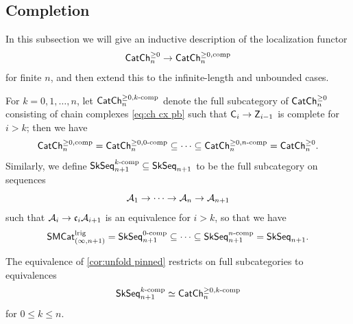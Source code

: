 \documentclass[a4paper,11pt]{article}
\begin{document}
\subsection{Completion}
\label{sec:completion}

In this subsection we will give an inductive description of the
localization functor
\[ \CChp_{n} \to \CChpc_{n}\]
for finite $n$, and then extend this to the infinite-length and unbounded
cases.

\begin{notation}
  For $k = 0,1,\dots,n$, let $\textup{\textsf{CatCh}}^{\geq 0,k\text{\textup{-comp}}}_{n}$ denote the full subcategory of $\textup{\textsf{CatCh}}^{\geq 0}_{n}$
  consisting of chain complexes \cref{eq:ch cx pb}
  such that $\oC_{i} \to \oZ_{i-1}$ is complete for $i > k$; then
  we have
  \[ \textup{\textsf{CatCh}}^{\geq 0,\text{\textup{comp}}}_{n} = \textup{\textsf{CatCh}}^{\geq 0,0\text{\textup{-comp}}}_{n} \subseteq 
    \cdots \subseteq \textup{\textsf{CatCh}}^{\geq 0,n\text{\textup{-comp}}}_{n} = \textup{\textsf{CatCh}}^{\geq 0}_{n}.\]
  Similarly, we define $\textup{\textsf{SkSeq}}_{n+1}^{k\text{\textup{-comp}}} \subseteq
  \textup{\textsf{SkSeq}}_{n+1}$ to be the full
  subcategory on sequences
  \[ \nA_{1} \to \cdots \to \nA_{n} \to \nA_{n+1}\]
  such that $\nA_{i} \to \core[i] \nA_{i+1}$ is an equivalence for $i
  > k$, so that we have
  \[ \textup{\textsf{SMCat}}_{(\infty,n+1)}^{\text{\textup{lrig}}} = \textup{\textsf{SkSeq}}_{n+1}^{0\text{\textup{-comp}}} \subseteq \cdots
    \subseteq \textup{\textsf{SkSeq}}_{n+1}^{n\text{\textup{-comp}}} = \textup{\textsf{SkSeq}}_{n+1}.\]
\end{notation}

\begin{observation}
  The equivalence of \cref{cor:unfold pinned} restricts on full
  subcategories to equivalences
  \[ \textup{\textsf{SkSeq}}_{n+1}^{k\text{\textup{-comp}}} \simeq
    \textup{\textsf{CatCh}}^{\geq 0,k\text{\textup{-comp}}}_{n} \]
  for $0 \leq k \leq n$.
\end{observation}
\end{document}
